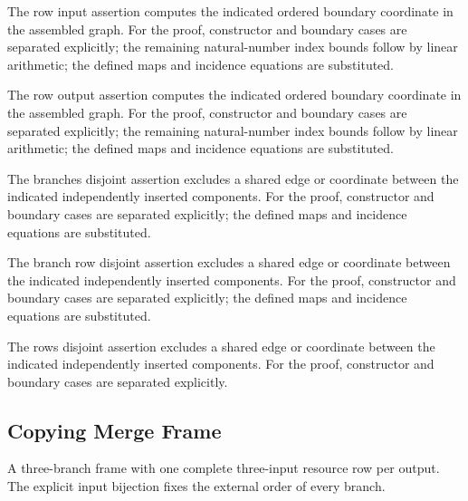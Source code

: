 The row input assertion computes the indicated ordered boundary coordinate in the assembled graph.
For the proof, constructor and boundary cases are separated explicitly; the remaining natural-number index bounds follow by linear arithmetic; the defined maps and incidence equations are substituted.
\par{}

The row output assertion computes the indicated ordered boundary coordinate in the assembled graph.
For the proof, constructor and boundary cases are separated explicitly; the remaining natural-number index bounds follow by linear arithmetic; the defined maps and incidence equations are substituted.
\par{}

The branches disjoint assertion excludes a shared edge or coordinate between the indicated independently inserted components.
For the proof, constructor and boundary cases are separated explicitly; the defined maps and incidence equations are substituted.
\par{}

The branch row disjoint assertion excludes a shared edge or coordinate between the indicated independently inserted components.
For the proof, constructor and boundary cases are separated explicitly; the defined maps and incidence equations are substituted.
\par{}

The rows disjoint assertion excludes a shared edge or coordinate between the indicated independently inserted components.
For the proof, constructor and boundary cases are separated explicitly.
\par{}

\subsection{Copying Merge Frame}
A three-branch frame with one complete three-input resource row per output. The explicit input bijection fixes the external order of every branch.

